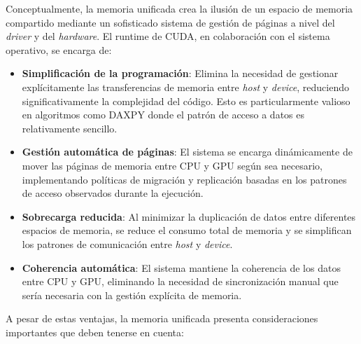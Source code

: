         Conceptualmente, la memoria unificada crea la ilusión de un espacio de memoria compartido mediante un sofisticado sistema de gestión de páginas a nivel del \textit{driver} y del \textit{hardware}. El runtime de CUDA, en colaboración con el sistema operativo, se encarga de:
    
        \begin{itemize}
        
            \item \textbf{Simplificación de la programación}: Elimina la necesidad de gestionar explícitamente las transferencias de memoria entre \textit{host} y \textit{device}, reduciendo significativamente la complejidad del código. Esto es particularmente valioso en algoritmos como DAXPY donde el patrón de acceso a datos es relativamente sencillo.

            \item \textbf{Gestión automática de páginas}: El sistema se encarga dinámicamente de mover las páginas de memoria entre CPU y GPU según sea necesario, implementando políticas de migración y replicación basadas en los patrones de acceso observados durante la ejecución.
            
            \item \textbf{Sobrecarga reducida}: Al minimizar la duplicación de datos entre diferentes espacios de memoria, se reduce el consumo total de memoria y se simplifican los patrones de comunicación entre \textit{host} y \textit{device}.
            
            \item \textbf{Coherencia automática}: El sistema mantiene la coherencia de los datos entre CPU y GPU, eliminando la necesidad de sincronización manual que sería necesaria con la gestión explícita de memoria.
            
        \end{itemize}
        
        A pesar de estas ventajas, la memoria unificada presenta consideraciones importantes que deben tenerse en cuenta:
        
